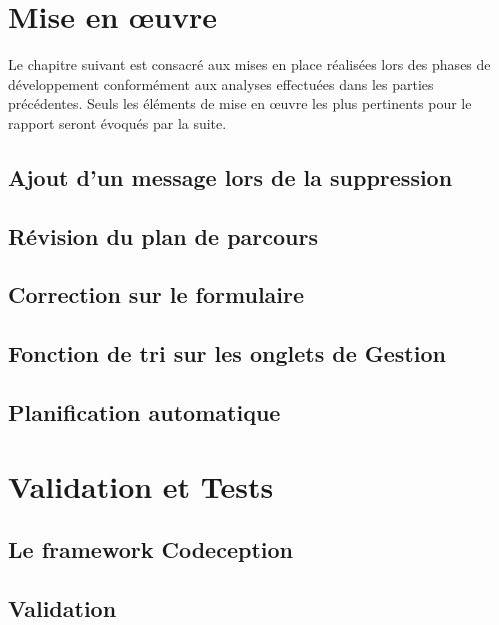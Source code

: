 \documentclass[noposter]{polytech/polytech}
\begin{document}
\chapter{Mise en œuvre}


Le chapitre suivant est consacré aux mises en place réalisées lors des phases de développement conformément aux analyses effectuées dans les parties précédentes. Seuls les éléments de mise en œuvre les plus pertinents pour le rapport seront évoqués par la suite.


\section{Ajout d'un message lors de la suppression}




\section{Révision du plan de parcours}


\section{Correction sur le formulaire}


\section{Fonction de tri sur les onglets de Gestion}


\section{Planification automatique}



\chapter{Validation et Tests}


\section{Le framework Codeception}


\section{Validation}
\end{document}

